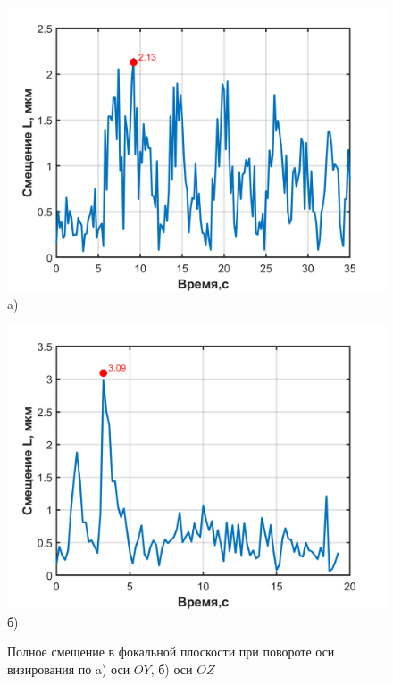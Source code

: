  
 \begin{figure}[!h]
 	\begin{minipage}[b][][b]{0.49\linewidth}\centering
 		\includegraphics[width=1\linewidth]{matlab/img/LmaxY.png} \\ a)
 	\end{minipage}
 	\hfill
 	\begin{minipage}[b][][b]{0.49\linewidth}\centering
 		\includegraphics[width=1\linewidth]{matlab/img/LmaxZ.png} \\ б)
 	\end{minipage}
 	\caption{Полное смещение в фокальной плоскости при повороте оси визирования по a) оси $OY$, б) оси $OZ$ }
 	\label{fig:biasL}
 \end{figure}
 
